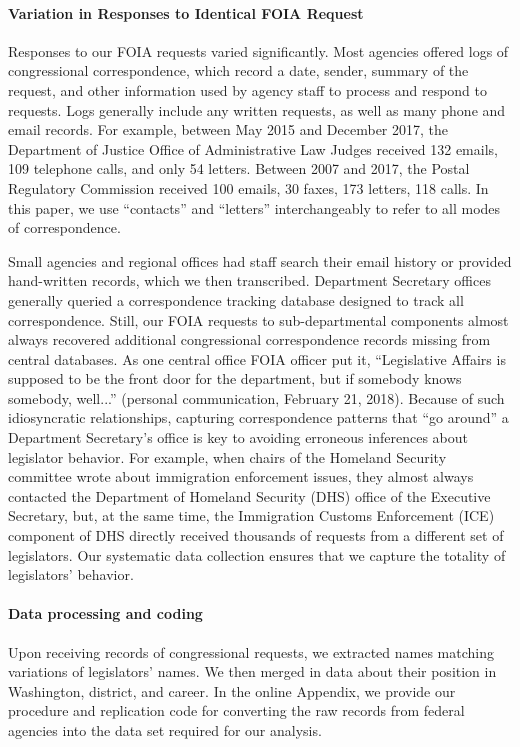 \documentclass[12pt]{article}
\begin{document}
\paragraph{Variation in Responses to Identical FOIA Request} Responses to our FOIA requests varied significantly. Most agencies offered logs of congressional correspondence, which record a date, sender, summary of the request, and other information used by agency staff to process and respond to requests. Logs generally include any written requests, as well as many phone and email records. For example, between May 2015 and December 2017, the Department of Justice Office of Administrative Law Judges received 132 emails, 109 telephone calls, and only 54 letters. Between 2007 and 2017, the Postal Regulatory Commission received 100 emails, 30 faxes, 173 letters, 118 calls. In this paper, we use ``contacts'' and ``letters'' interchangeably to refer to all modes of correspondence. 

Small agencies and regional offices had staff search their email history or provided hand-written records, which we then transcribed. Department Secretary offices generally queried a correspondence tracking database designed to track all correspondence. Still, our FOIA requests to sub-departmental components almost always recovered additional congressional correspondence records missing from central databases. As one central office FOIA officer put it, ``Legislative Affairs is supposed to be the front door for the department, but if somebody knows somebody, well...'' (personal communication, February 21, 2018). Because of such idiosyncratic relationships, capturing correspondence patterns that ``go around'' a Department Secretary's office is key to avoiding erroneous inferences about legislator behavior. For example, when chairs of the Homeland Security committee wrote about immigration enforcement issues, they almost always contacted the Department of Homeland Security (DHS) office of the Executive Secretary, but, at the same time, the Immigration Customs Enforcement (ICE) component of DHS directly received thousands of requests from a different set of legislators. Our systematic data collection ensures that we capture the totality of legislators' behavior.

\paragraph{Data processing and coding} Upon receiving records of congressional requests, we extracted names matching variations of legislators' names. We then merged in data about their position in Washington, district, and career. In the online Appendix, we provide our procedure and replication code for converting the raw records from federal agencies into the data set required for our analysis. 
\end{document}
